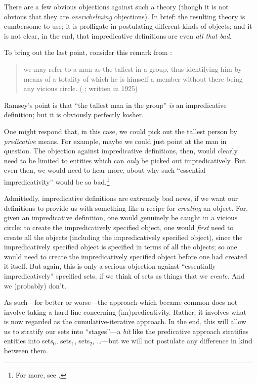 \documentclass[../../../include/open-logic-section]{subfiles}
\begin{document}
There are a few obvious objections against such a theory (though it is not obvious that they are \emph{overwhelming} objections). In brief: the resulting theory is cumbersome to use; it is profligate in postulating different kinds of objects; and it is not clear, in the end, that impredicative definitions are even  \emph{all that bad}. 
	
To bring out the last point, consider this remark from  \citeauthor{Ramsey1925}:
	\begin{quote}
		we may refer to a man as the tallest in a group, thus identifying him by means of a totality of which he is himself a member without there being any vicious circle. (\citeauthor{Ramsey1925} \citeyear{Ramsey1925}; written in 1925)
	\end{quote}
Ramsey's point is that ``the tallest man in the group'' \emph{is} an impredicative definition; but it is obviously perfectly kosher. 

One might respond that, in this case, we could pick out the tallest person by \emph{predicative} means. For example, maybe we could just point at the man in question. The objection against impredicative definitions, then, would clearly need to be limited to entities which can \emph{only} be picked out impredicatively. But even then, we would need to hear more, about why such ``essential impredicativity'' would be so bad.\footnote{For more, see \citet{LinneboPID}.}
	
Admittedly, impredicative definitions are extremely bad news, if we want our definitions to provide us with something like a recipe for \emph{creating} an object. For, given an impredicative definition, one would genuinely be caught in a vicious circle: to create the impredicatively specified object, one would \emph{first} need to create all the objects (including the impredicatively specified object), since the impredicatively specified object is specified in terms of all the objects; so one would need to create the impredicatively specified object before one had created it itself. But again, this is only a serious objection against ``essentially impredicatively'' specified sets, if we think of sets as things that we \emph{create}. And we (probably) don't.

As such---for better or worse---the approach which became common does not involve taking a hard line concerning (im)predicativity. Rather, it involves what is now regarded as the cumulative-iterative approach. In the end, this will allow us to stratify our sets into ``stages''---a \emph{bit} like the predicative approach stratifies entities into sets$_0$, sets$_1$, sets$_2$, \ldots---but we will not postulate any difference in kind between them. 
\end{document}
